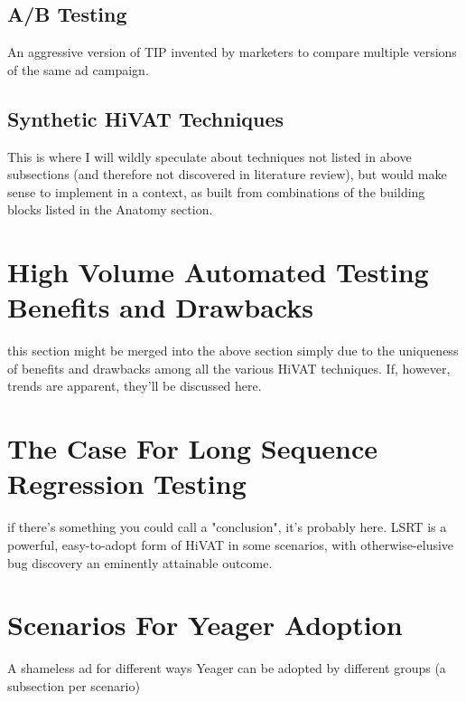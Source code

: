 \subsection{A/B Testing}
An aggressive version of TIP invented by marketers to compare multiple versions of the same ad campaign. %

\subsection{Synthetic HiVAT Techniques}
This is where I will wildly speculate about techniques not listed in above subsections (and therefore not discovered in literature review), but would make sense to implement in a context, as built from combinations of the building blocks listed in the Anatomy section. %

\section{High Volume Automated Testing Benefits and Drawbacks}
  this section might be merged into the above section simply due to the uniqueness of benefits and drawbacks among all the various HiVAT techniques. If, however, trends are apparent, they'll be discussed here. %

\section{The Case For Long Sequence Regression Testing}
  if there's something you could call a "conclusion", it's probably here. LSRT is a powerful, easy-to-adopt form of HiVAT in some scenarios, with otherwise-elusive bug discovery an eminently attainable outcome. %

\section{Scenarios For Yeager Adoption}
A shameless ad for different ways Yeager can be adopted by different groups (a subsection per scenario) %
